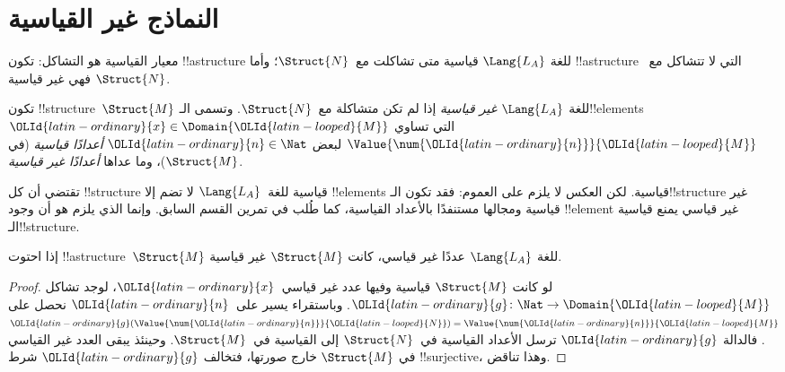 \documentclass[../../../include/open-logic-section]{subfiles}
\begin{document}
\section{النماذج غير القياسية}

\begin{explain}
معيار القياسية هو التشاكل: تكون !!a{structure} للغة
$\Lang{L_A}$ قياسية متى تشاكلت مع~$\Struct{N}$؛ وأما
!!a{structure} التي لا تتشاكل مع~$\Struct{N}$ فهي غير قياسية.
\end{explain}

\begin{defn}
تكون !!{structure}~$\Struct{M}$ للغة $\Lang{L_A}$ \emph{غير قياسية}
إذا لم تكن متشاكلة مع~$\Struct{N}$. وتسمى الـ!!{element}s
${\OLId{latin-ordinary}{x}} \in \Domain{{\OLId{latin-looped}{M}}}$ التي تساوي $\Value{\num{{\OLId{latin-ordinary}{n}}}}{{\OLId{latin-looped}{M}}}$ لبعض
${\OLId{latin-ordinary}{n}} \in \Nat$ \emph{أعدادًا قياسية} (في $\Struct{M}$)، وما عداها
\emph{أعدادًا غير قياسية}.
\end{defn}

\begin{explain}
تقتضي  أن كل !!{structure}
قياسية للغة~$\Lang{L_A}$ لا تضم إلا !!{element}s قياسية.
لكن العكس لا يلزم على العموم: فقد تكون الـ!!{structure}
غير قياسية ومجالها مستنفدًا بالأعداد القياسية، كما طُلب
في تمرين القسم السابق. وإنما الذي يلزم هو أن وجود
!!{element} غير قياسي يمنع قياسية الـ!!{structure}.
\end{explain}

\begin{prop}
إذا احتوت !!a{structure}~$\Struct{M}$ للغة $\Lang{L_A}$ عددًا غير
قياسي، كانت $\Struct{M}$ غير قياسية.
\end{prop}

\begin{proof}
لو كانت $\Struct{M}$ قياسية وفيها عدد غير قياسي~${\OLId{latin-ordinary}{x}}$،
لوجد تشاكل ${\OLId{latin-ordinary}{g}}\colon \Nat \to \Domain{{\OLId{latin-looped}{M}}}$. وباستقراء يسير
على~${\OLId{latin-ordinary}{n}}$ نحصل على
${\OLId{latin-ordinary}{g}}(\Value{\num{{\OLId{latin-ordinary}{n}}}}{{\OLId{latin-looped}{N}}})=\Value{\num{{\OLId{latin-ordinary}{n}}}}{{\OLId{latin-looped}{M}}}$. فالدالة ${\OLId{latin-ordinary}{g}}$
ترسل الأعداد القياسية في~$\Struct{N}$ إلى القياسية في~$\Struct{M}$.
وحينئذ يبقى العدد غير القياسي في $\Struct{M}$ خارج صورتها،
فتخالف ${\OLId{latin-ordinary}{g}}$ شرط !!{surjective}، وهذا تناقض.
\end{proof}
\end{document}
